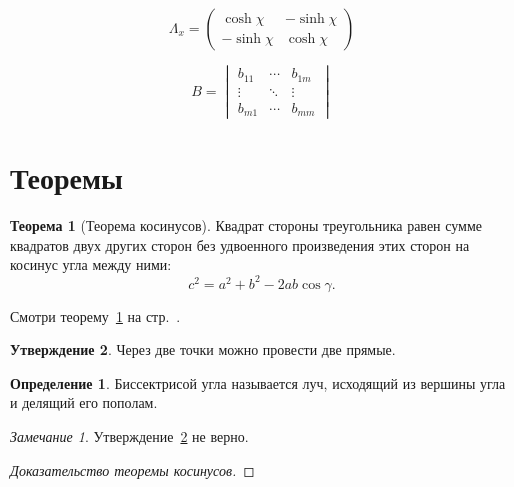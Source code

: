 \documentclass[a4paper,12pt]{article}
\theoremstyle{definition}
\newtheorem{theorem}{Теорема}[section]
\newtheorem{proposition}[theorem]{Утверждение}
\newtheorem{definition}{Определение}[theorem]
\theoremstyle{remark}
\newtheorem*{remark}{Замечание}
\begin{document}
\begin{equation}
  \Lambda_x =
  \begin{pmatrix}
    \cosh \chi & -\sinh \chi \\
    -\sinh \chi & \cosh \chi
  \end{pmatrix}
\end{equation}

\begin{equation}
  B =
  \begin{vmatrix}
    b_{11} & \cdots & b_{1m} \\
    \vdots & \ddots & \vdots \\
    b_{m1} & \cdots & b_{mm}
  \end{vmatrix}
\end{equation}

\section{Теоремы}

\begin{theorem}[Теорема косинусов]\label{thm:cos}
  Квадрат стороны треугольника равен сумме квадратов двух других сторон
  без удвоенного произведения этих сторон на косинус угла между ними:
  \[
    c^2 = a^2 + b^2 - 2ab\cos\gamma .
  \]
\end{theorem}

Смотри теорему~\ref{thm:cos} на стр.~\pageref{thm:cos}.

\begin{proposition}\label{prop:twolines}
  Через две точки можно провести две прямые.
\end{proposition}

\begin{definition}
  Биссектрисой угла называется луч, исходящий из вершины угла и делящий его пополам.
\end{definition}

\begin{remark}
  Утверждение~\ref{prop:twolines} не верно.
\end{remark}

\begin{proof}[Доказательство теоремы косинусов]
  \lipsum[1-2]
\end{proof}
\end{document}
